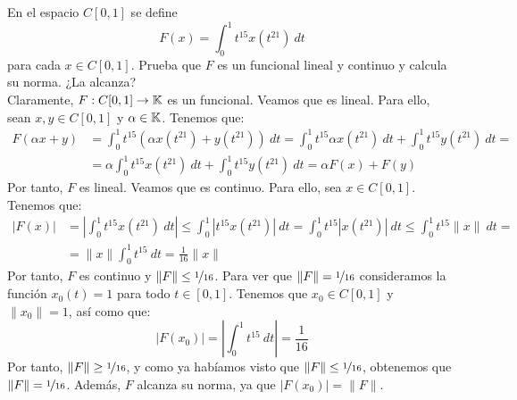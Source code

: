 \documentclass[12pt]{article}
\begin{document}
    \begin{ejercicio}
        En el espacio $C[0,1]$ se define
        \begin{equation*}
            F(x) = \int_{0}^{1} t^{15}x(t^{21})~dt 
        \end{equation*}
        para cada $x\in C[0,1]$. Prueba que $F$ es un funcional lineal y continuo y calcula su norma. ¿La alcanza?\\

        Claramente, $F: C[0,1]\to \mathbb{K}$ es un funcional. Veamos que es lineal. Para ello, sean $x,y\in C[0,1]$ y $\alpha\in \mathbb{K}$. Tenemos que:
        \begin{align*}
            F(\alpha x + y) &= \int_{0}^{1} t^{15}(\alpha x(t^{21}) + y(t^{21}))~dt = \int_{0}^{1} t^{15}\alpha x(t^{21})~dt + \int_{0}^{1} t^{15}y(t^{21})~dt =\\&= \alpha\int_{0}^{1} t^{15}x(t^{21})~dt + \int_{0}^{1} t^{15}y(t^{21})~dt = \alpha F(x) + F(y)
        \end{align*}
        Por tanto, $F$ es lineal. Veamos que es continuo. Para ello, sea $x\in C[0,1]$. Tenemos que:
        \begin{align*}
            |F(x)| &= \left|\int_{0}^{1} t^{15} x(t^{21})~dt\right| \leq \int_{0}^{1} |t^{15} x(t^{21})|~dt = \int_{0}^{1} t^{15} |x(t^{21})|~dt \leq \int_{0}^{1} t^{15} \|x\|~dt =\\&= \|x\|\int_{0}^{1} t^{15}~dt = \frac{1}{16}\|x\|
        \end{align*}
        Por tanto, $F$ es continuo y $\|F\|\leq \nicefrac{1}{16}$. Para ver que $\|F\| = \nicefrac{1}{16}$ consideramos la función $x_0(t) = 1$ para todo $t\in [0,1]$. Tenemos que $x_0\in C[0,1]$ y $\|x_0\| = 1$, así como que:
        \begin{equation*}
            |F(x_0)| = \left|\int_{0}^{1} t^{15}~dt\right| = \frac{1}{16}
        \end{equation*}
        Por tanto, $\|F\| \geq \nicefrac{1}{16}$, y como ya habíamos visto que $\|F\|\leq \nicefrac{1}{16}$, obtenemos que $\|F\| = \nicefrac{1}{16}$. Además, $F$ alcanza su norma, ya que $|F(x_0)| = \|F\|$.
    \end{ejercicio}
\end{document}
